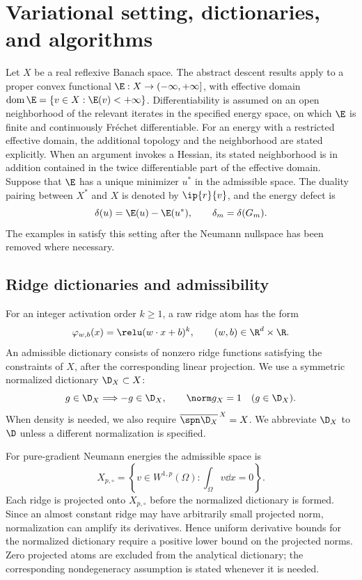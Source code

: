 \section{Variational setting, dictionaries, and algorithms}
\label{sec:setting}

Let \(X\) be a real reflexive Banach space. The abstract descent results apply to a proper convex
functional \(\E:X\to(-\infty,+\infty]\), with effective domain
\(\operatorname{dom}\E=\{v\in X:\E(v)<+\infty\}\).
Differentiability is assumed on an open neighborhood of the relevant iterates in the specified
energy space, on which \(\E\) is finite and continuously Fr\'echet differentiable. For an energy
with a restricted effective domain, the additional topology and the neighborhood are stated
explicitly. When an argument invokes a Hessian, its stated neighborhood is in addition contained in
the twice differentiable part of the effective domain. Suppose that \(\E\) has a unique minimizer
\(u^*\) in the admissible space. The duality pairing between \(X^*\) and \(X\) is denoted by
\(\ip{r}{v}\), and the energy defect is
\[
  \delta(u)=\E(u)-\E(u^*), \qquad \delta_m=\delta(G_m).
\]
The examples in  satisfy this setting after the Neumann nullspace has been
removed where necessary.

\subsection{Ridge dictionaries and admissibility}

For an integer activation order \(k\geq1\), a raw ridge atom has the form
\[
  \varphi_{w,b}(x)=\relu(w\cdot x+b)^k,
  \qquad (w,b)\in\R^d\times\R.
\]
An admissible dictionary consists of nonzero ridge functions satisfying the constraints of \(X\),
after the corresponding linear projection. We use a symmetric normalized dictionary
\(\D_X\subset X\):
\[
g\in\D_X\Longrightarrow-g\in\D_X,\qquad \norm g_X=1\quad(g\in\D_X).
\]
When density is needed, we also require \(\overline{\spn\D_X}^{\,X}=X\).
We abbreviate \(\D_X\) to \(\D\) unless a different normalization is specified.

For pure-gradient Neumann energies the admissible space is
\[
  X_{p,\circ}=\left\{v\in W^{1,p}(\Omega):\int_\Omega v\dd x=0\right\}.
\]
Each ridge is projected onto $X_{p,\circ}$ before the normalized dictionary is formed.
Since an almost constant ridge may have arbitrarily small projected norm, normalization
can amplify its derivatives. Hence uniform derivative bounds for the normalized
dictionary require a positive lower bound on the projected norms. Zero projected
atoms are excluded from the analytical dictionary; the corresponding nondegeneracy
assumption is stated whenever it is needed.

